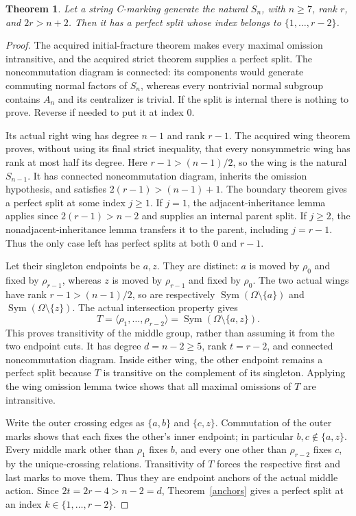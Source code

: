 \documentclass[11pt,a4paper]{article}
\newtheorem{theorem}[lemma]{Theorem}
\newcommand{\gen}[1]{\langle#1\rangle}
\newcommand{\Sym}{\operatorname{Sym}}
\begin{document}
\begin{theorem}\label{internal}
Let a string C-marking generate the natural $S_n$, with $n\ge7$,
rank $r$, and $2r>n+2$. Then it has a perfect split whose index
belongs to $\{1,\ldots,r-2\}$.
\end{theorem}
\begin{proof}
The acquired initial-fracture theorem makes every maximal omission
intransitive, and the acquired strict theorem supplies a perfect
split. The noncommutation diagram is connected: its components would
generate commuting normal factors of $S_n$, whereas every nontrivial
normal subgroup contains $A_n$ and its centralizer is trivial.
If the split is internal there is nothing to prove. Reverse if needed
to put it at index $0$.

Its actual right wing has degree $n-1$ and rank $r-1$.
The acquired wing theorem proves, without using its final strict
inequality, that every nonsymmetric wing has rank at most half
its degree. Here $r-1>(n-1)/2$, so the wing is the natural
$S_{n-1}$. It has connected noncommutation diagram, inherits the
omission hypothesis, and satisfies
$2(r-1)>(n-1)+1$. The boundary theorem gives a perfect split
at some index $j\ge1$. If $j=1$, the adjacent-inheritance lemma
applies since $2(r-1)>n-2$ and supplies an internal parent split.
If $j\ge2$, the nonadjacent-inheritance lemma transfers it to
the parent, including $j=r-1$. Thus the only case left has
perfect splits at both $0$ and $r-1$.

Let their singleton endpoints be $a,z$. They are distinct:
$a$ is moved by $\rho_0$ and fixed by $\rho_{r-1}$,
whereas $z$ is moved by $\rho_{r-1}$ and fixed by $\rho_0$.
The two actual wings have rank $r-1>(n-1)/2$, so are respectively
$\Sym(\Omega\setminus\{a\})$ and
$\Sym(\Omega\setminus\{z\})$. The actual intersection property gives
\[
 T=\gen{\rho_1,\ldots,\rho_{r-2}}
   =\Sym(\Omega\setminus\{a,z\}).
\]
This proves transitivity of the middle group, rather than assuming it
from the two endpoint cuts. It has degree $d=n-2\ge5$, rank
$t=r-2$, and connected noncommutation diagram. Inside either wing,
the other endpoint remains a perfect split because $T$ is transitive
on the complement of its singleton. Applying the wing omission lemma
twice shows that all maximal omissions of $T$ are intransitive.

Write the outer crossing edges as $\{a,b\}$ and $\{c,z\}$.
Commutation of the outer marks shows that each fixes the other's
inner endpoint; in particular $b,c\notin\{a,z\}$. Every middle
mark other than $\rho_1$ fixes $b$, and every one other than
$\rho_{r-2}$ fixes $c$, by the unique-crossing relations.
Transitivity of $T$ forces the respective first and last marks to
move them. Thus they are endpoint anchors of the actual middle
action. Since $2t=2r-4>n-2=d$, Theorem~\ref{anchors} gives a
perfect split at an index $k\in\{1,\ldots,r-2\}$.


\end{proof}
\end{document}
